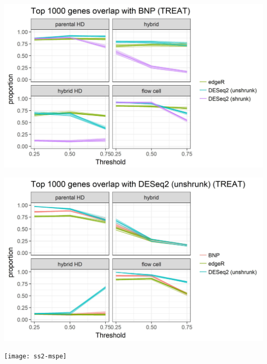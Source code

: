 \documentclass{beamer}
\begin{document}
\begin{frame}[label=current]
  \includegraphics[width=\textwidth]{overlap-ss2-bnp}
\end{frame}

\begin{frame}[label=current]
  \includegraphics[width=\textwidth]{overlap-ss2-deseq}
\end{frame}

\begin{frame}[label=current]
  \texttt{[image: ss2-mspe]}
\end{frame}
\end{document}
